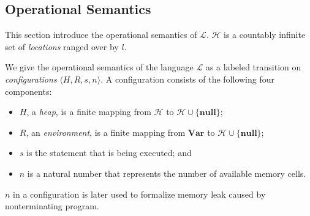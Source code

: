 \documentclass[english]{jssst_ppl} %
\newcommand\LET{\mathbf{let}\;}
\newcommand\IN{\mathbf{in}\;}
\newcommand\SKIP{\mathbf{skip}}
\newcommand\NULL{\mathbf{null}}
\newcommand\IFNULL{\mathbf{ifnull}\;}
\newcommand\THEN{\mathbf{then}\;}
\newcommand\ELSE{\mathbf{else}\;}
\newcommand\Malloc{\mathbf{malloc}}
\newcommand\Free{\mathbf{free}}
\newcommand\Cirx{(x)}
\newcommand\set[1]{\{#1\}}
\newcommand\VAR{\mathbf{Var}}
\theoremstyle{definition}
\begin{document}

\subsection{Operational Semantics}
\label{sec:languageSemantics}

This section introduce the operational semantics of \(\mathcal{L}\).
\(\mathcal{H}\) is a countably infinite set of \emph{locations} ranged
over by \(l\).

We give the operational semantics of the language \(\mathcal{L}\) as a
labeled transition on \emph{configurations} \(\langle H, R, s, n
\rangle\).  A configuration consists of the following four components:
\begin{itemize}
\item \(H\), a \emph{heap}, is a finite mapping from \(\mathcal{H}\)
  to \(\mathcal{H} \cup \set{\NULL}\);
\item \(R\), an \emph{environment}, is a finite mapping from \(\VAR\)
  to \(\mathcal{H} \cup \set{\NULL}\);
\item \(s\) is the statement that is being executed; and
\item \(n\) is a natural number that represents the number of
  available memory cells.
\end{itemize}
\(n\) in a configuration is later used to formalize memory leak caused
by nonterminating program.
\end{document}
